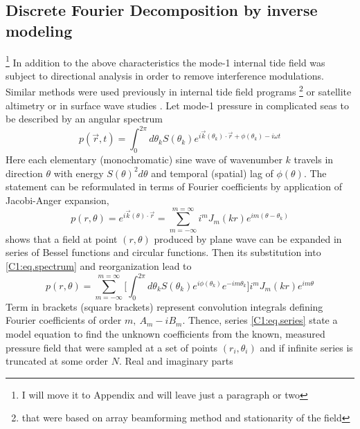 \documentclass[12pt]{article}
\begin{document}
\subsection{Discrete Fourier Decomposition by inverse modeling} \footnote{I will move it to 
Appendix and will leave just a paragraph or two}
In addition to the above characteristics the mode-1 internal tide field was subject to directional 
analysis in order to remove interference modulations. Similar methods 
were used previously in internal tide field programs \citep{hendry1977observations, 
lozovatsky2003spatial} \footnote{that were based on array beamforming method and stationarity of 
the field} or 
satellite altimetry \citep{dushaw2002mapping} or in surface wave studies 
\citep{longuet1961observations, munk1963directional, long1986inverse}. Let 
mode-1 pressure in complicated seas to be described by an angular spectrum
\begin{equation}
\label{C1:eq.spectrum}
p(\vec{r}, t) = \int_0^{2\pi}  d\theta_k S(\theta_k) e^{i \vec{k}(\theta_k) \cdot \vec{r} + 
\phi(\theta_k) - i \omega t}
\end{equation}
Here each elementary (monochromatic) sine wave of wavenumber $k$ travels in direction $\theta$ with 
energy $S(\theta)^2 d\theta$ and temporal (spatial) lag of $\phi(\theta)$. The statement can be 
reformulated in terms of Fourier coefficients \citep{munk1963directional} by application of 
Jacobi-Anger expansion,
\begin{equation}
p(r, \theta) = e^{i \vec{k}(\theta) \cdot \vec{r}} = \sum_{m = -\infty}^{m = \infty} i^{m} J_{m}(k 
r) e^{im(\theta - \theta_k)}
\end{equation}
shows that a field at point $(r, \theta)$ produced by plane wave can be expanded in series of 
Bessel functions and circular functions. Then its substitution into \eqref{C1:eq.spectrum} and 
reorganization lead to
\begin{equation}
\label{C1:p.eq}
p(r, \theta) = \sum_{m=-\infty}^{m=\infty} \big[ \int_0^{2\pi}  d\theta_k S(\theta_k) 
e^{i\phi(\theta_k)} e^{-im\theta_k} \big] i^m J_m(kr) e^{im\theta}
\end{equation}
Term in brackets (square brackets) represent convolution integrals defining Fourier coefficients of 
order $m,~A_m - i B_m$. Thence, series \eqref{C1:eq.series} state a model equation to find the 
unknown coefficients from the known, measured pressure field that were sampled at a set of points 
$(r_i, \theta_i)$ and if infinite series is truncated at some order $N$. Real and imaginary parts 
\end{document}
